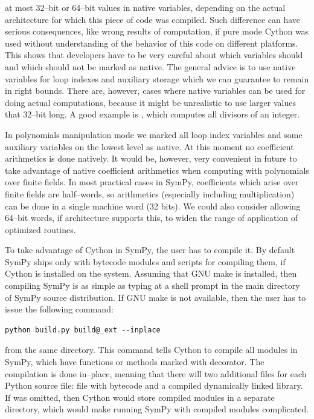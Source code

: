 at most 32--bit or 64--bit values in native variables, depending on the actual architecture for
which this piece of code was compiled. Such difference can have serious consequences, like wrong
results of computation, if pure mode Cython was used without understanding of the behavior of this
code on different platforms. This shows that developers have to be very careful about which variables
should and which should not be marked as native. The general advice is to use native variables for
loop indexes and auxiliary storage which we can guarantee to remain in right bounds. There are,
however, cases where native variables can be used for doing actual computations, because it
might be unrealistic to use larger values that 32--bit long. A good example is ,
which computes all divisors of an integer.

In polynomials manipulation mode we marked all loop index variables and some auxiliary variables on
the lowest level as native. At this moment no coefficient arithmetics is done natively. It would be,
however, very convenient in future to take advantage of native coefficient arithmetics when computing
with polynomials over finite fields. In most practical cases in SymPy, coefficients which arise over
finite fields are half--words, so arithmetics (especially including multiplication) can be done in a
single machine word (32 bits). We could also consider allowing 64--bit words, if architecture supports
this, to widen the range of application of optimized routines.

To take advantage of Cython in SymPy, the user has to compile it. By default SymPy ships only with
bytecode modules and scripts for compiling them, if Cython is installed on the system. Assuming
that GNU make is installed, then compiling SymPy is as simple as typing  at a shell prompt
in the main directory of SymPy source distribution. If GNU make is not available, then the user
has to issue the following command:

\begin{Verbatim}[commandchars=@\[\]]
python build.py build@_ext --inplace
\end{Verbatim}
\noindent
from the same directory. This command tells Cython to compile all modules in SymPy, which have
functions or methods marked with  decorator. The compilation is done in--place,
meaning that there will two additional files for each Python source file:  file with
bytecode and a compiled dynamically linked library. If  was omitted, then Cython
would store compiled modules in a separate directory, which would make running SymPy with
compiled modules complicated.


